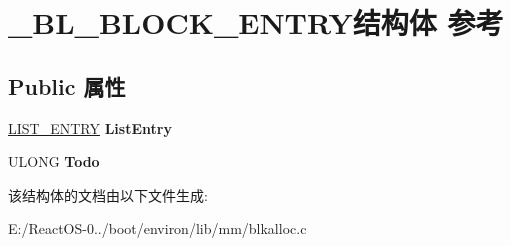 \hypertarget{struct___b_l___b_l_o_c_k___e_n_t_r_y}{}\section{\+\_\+\+B\+L\+\_\+\+B\+L\+O\+C\+K\+\_\+\+E\+N\+T\+R\+Y结构体 参考}
\label{struct___b_l___b_l_o_c_k___e_n_t_r_y}
\subsection*{Public 属性}
\begin{DoxyCompactItemize}
\item 
\mbox{\label{struct___b_l___b_l_o_c_k___e_n_t_r_y_a535b21ceb9d446be39d2270b998fb839}} 
\hyperlink{struct___l_i_s_t___e_n_t_r_y}{L\+I\+S\+T\+\_\+\+E\+N\+T\+RY} {\bfseries List\+Entry}
\item 
\mbox{\label{struct___b_l___b_l_o_c_k___e_n_t_r_y_a6ad1075af08330db03b9c04beeba9ef8}} 
U\+L\+O\+NG {\bfseries Todo}
\end{DoxyCompactItemize}


该结构体的文档由以下文件生成\+:\begin{DoxyCompactItemize}
\item 
E\+:/\+React\+O\+S-\/0../boot/environ/lib/mm/blkalloc.\+c\end{DoxyCompactItemize}
